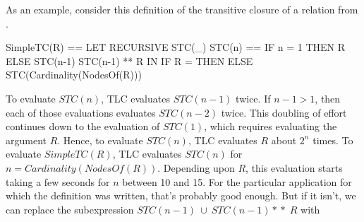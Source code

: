 \documentclass[fleqn,leqno]{article}
\begin{document}
As an example, consider this definition of the 
transitive closure of a relation from 
  .
\begin{display}
\begin{notla}
SimpleTC(R) ==
  LET RECURSIVE STC(_)
      STC(n) == IF n = 1 THEN R
                         ELSE STC(n-1)  \cup  STC(n-1) **  R
  IN IF R = {} THEN {} ELSE STC(Cardinality(NodesOf(R)))
\end{notla}
\begin{tlatex}
%
%
%
\end{tlatex}
\end{display}
To evaluate $STC(n)$, TLC evaluates $STC(n-1)$ twice.  If $n-1>1$,
then each of those evaluations evaluates $STC(n-2)$ twice.  This
doubling of effort continues down to the evaluation of $STC(1)$, which
requires evaluating the argument $R$.  Hence, to evaluate $STC(n)$,
TLC evaluates $R$ about $2^{n}$ times.  To evaluate $SimpleTC(R)$, TLC
evaluates $STC(n)$ for $n=Cardinality(NodesOf(R))$.  Depending upon
$R$, this evaluation starts taking a few seconds for $n$ between
10 and 15.  For the particular application for which the definition
was written, that's probably good enough.  But if it isn't,
we can replace the subexpression
  \mbox{$STC(n-1) \ \cup \ STC(n-1)*\!*\;R$}
with
\begin{display}
\begin{tlatex}
%
\end{tlatex}
\end{display}

\medskip
\end{document}
